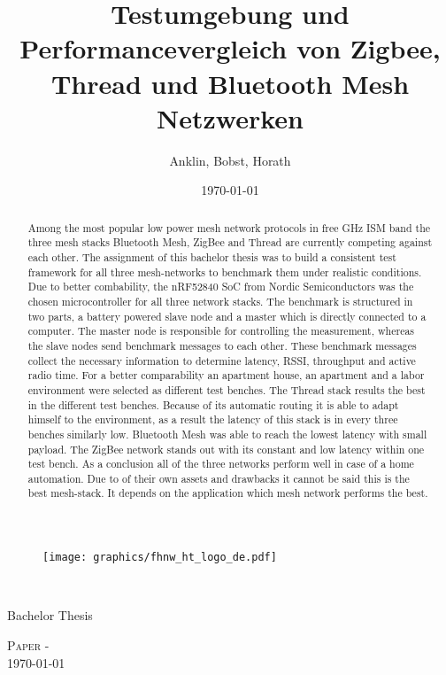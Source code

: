 \documentclass[final]{fhnwreport}       %
\title{Testumgebung und Performancevergleich von Zigbee, Thread und Bluetooth Mesh Netzwerken}  		        %
\author{Anklin, Bobst, Horath}      				    %
\date{\today}          				   %
\begin{document}
\thispagestyle{empty}
	\begin{figure}
		 \vspace*{-\topskip}\vspace*{-\headsep}
		\texttt{[image: graphics/fhnw\_ht\_logo\_de.pdf]}
	\end{figure}
	\begin{center}
		\vspace*{2cm}
		{\huge{\textbf{\thetitle}}}\\
		\vspace*{1cm}
		
		{\huge{Bachelor Thesis}}\\
		\vspace*{0.5cm}
		
		{\scshape\Large Paper - \theauthor \\} \Large{\today}
		\vspace*{3cm}
		\thispagestyle{empty}
		\begin{abstract}
			Among the most popular low power mesh network protocols in free GHz ISM band the three mesh stacks Bluetooth Mesh, ZigBee and Thread are currently competing against each other. The assignment of this bachelor thesis was to build a consistent test framework for all three mesh-networks to benchmark them under realistic conditions. Due to better combability, the nRF52840 SoC from Nordic Semiconductors was the chosen microcontroller for all three network stacks. The benchmark is structured in two parts, a battery powered slave node and a master which is directly connected to a computer. The master node is responsible for controlling the measurement, whereas the slave nodes send benchmark messages to each other. These benchmark messages collect the necessary information to determine latency, RSSI, throughput and active radio time. For a better comparability an apartment house, an apartment and a labor environment were selected as different test benches. The Thread stack results the best in the different test benches. Because of its automatic routing it is able to adapt himself to the environment, as a result the latency of this stack is in every three benches similarly low. Bluetooth Mesh was able to reach the lowest latency with small payload. The ZigBee network stands out with its constant and low latency within one test bench. As a conclusion all of the three networks perform well in case of a home automation. Due to of their own assets and drawbacks it cannot be said this is the best mesh-stack. It depends on the application which mesh network performs the best.
		\end{abstract}
	\end{center}
\clearpage
\end{document}
